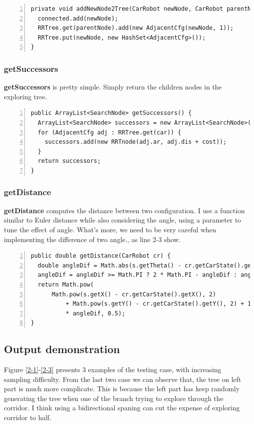 \documentclass{article}
\begin{document}
\begin{lstlisting}[numbers=left]
private void addNewNode2Tree(CarRobot newNode, CarRobot parentNode) {
  connected.add(newNode);
  RRTree.get(parentNode).add(new AdjacentCfg(newNode, 1));
  RRTree.put(newNode, new HashSet<AdjacentCfg>());
}
\end{lstlisting}





\subsubsection{getSuccessors}

\textbf{getSuccessors} is pretty simple. Simply return the children nodes in the exploring tree.

\begin{lstlisting}[numbers=left]
public ArrayList<SearchNode> getSuccessors() {
  ArrayList<SearchNode> successors = new ArrayList<SearchNode>();
  for (AdjacentCfg adj : RRTree.get(car)) {
    successors.add(new RRTnode(adj.ar, adj.dis + cost));
  }
  return successors;
}
\end{lstlisting}


\subsubsection{getDistance}

\textbf{getDistance} computes the distance between two configuration. I use a function similar to Euler distance while also considering the angle, using a parameter to tune the effect of angle. What's more, we need to be very careful when implementing the difference of two angle., as line 2-3 show.

\begin{lstlisting}[numbers=left]
public double getDistance(CarRobot cr) {
  double angleDif = Math.abs(s.getTheta() - cr.getCarState().getTheta());
  angleDif = angleDif >= Math.PI ? 2 * Math.PI - angleDif : angleDif;
  return Math.pow(
      Math.pow(s.getX() - cr.getCarState().getX(), 2)
          + Math.pow(s.getY() - cr.getCarState().getY(), 2) + 100
          * angleDif, 0.5);
}
\end{lstlisting}










\subsection{Output demonstration}
Figure \ref{2-1}-\ref{2-3} presents 3 examples of the testing case, with increasing sampling difficulty. From the last two case we can observe that, the tree on left part is much more complicate. This is because the left part has keep randomly generating the tree when one of the branch trying to explore through the corridor. I think using a bidirectional spaning can cut the expense of exploring corridor to half.
\end{document}
